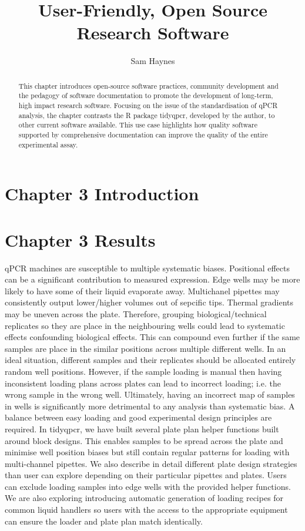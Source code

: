 \documentclass{SBCbookchapter}
\author{Sam Haynes}
\title{User-Friendly, Open Source Research Software}
\begin{document}
\maketitle

\begin{abstract}
This chapter introduces open-source software practices, community development and the pedagogy of software documentation to promote the development of long-term, high impact research software. Focusing on the issue of the standardisation of qPCR analysis, the chapter contrasts the R package tidyqpcr, developed by the author, to other current software available. This use case highlights how quality software supported by comprehensive documentation can improve the quality of the entire experimental assay.


\end{abstract}

\section{Chapter 3 Introduction}

\section{Chapter 3 Results}

qPCR machines are susceptible to multiple systematic biases. Positional effects can be a significant contribution to measured expression. Edge wells may be more likely to have some of their liquid evaporate away. Multichanel pipettes may consistently output lower/higher volumes out of sepcific tips. Thermal gradients may be uneven across the plate. Therefore, grouping biological/technical replicates so they are place in the neighbouring wells could lead to systematic effects confounding biological effects. This can compound even further if the same samples are place in the similar positions across multiple different wells. In an ideal situation, different samples and their replicates should be allocated entirely random well positions. However, if the sample loading is manual then having inconsistent loading plans across plates can lead to incorrect loading; i.e. the wrong sample in the wrong well. Ultimately, having an incorrect map of samples in wells is significantly more detrimental to any analysis than systematic bias. A balance between easy loading and good experimental design principles are required. In tidyqpcr, we have built several plate plan helper functions built around block designs. This enables samples to be spread across the plate and minimise well position biases but still contain regular patterns for loading with multi-channel pipettes. We also describe in detail different plate design strategies than user can explore depending on their particular pipettes and plates. Users can exclude loading samples into edge wells with the provided helper functions. We are also exploring introducing automatic generation of loading recipes for common liquid handlers so users with the access to the appropriate equipment can ensure the loader and plate plan match identically.
\end{document}
